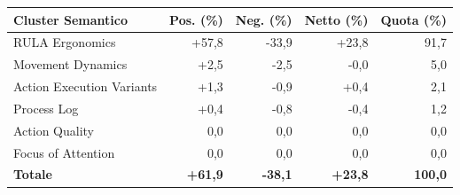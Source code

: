 \begin{tabular*}{\linewidth}{@{}l@{\extracolsep{\fill}}rrrr@{}}
\toprule
\textbf{Cluster Semantico} & \textbf{Pos. (\%)} & \textbf{Neg. (\%)} & \textbf{Netto (\%)} & \textbf{Quota (\%)} \\
\midrule
RULA Ergonomics & +57{,}8 & -33{,}9 & +23{,}8 & 91{,}7 \\
Movement Dynamics & +2{,}5 & -2{,}5 & -0{,}0 & 5{,}0 \\
Action Execution Variants & +1{,}3 & -0{,}9 & +0{,}4 & 2{,}1 \\
Process Log & +0{,}4 & -0{,}8 & -0{,}4 & 1{,}2 \\
Action Quality & 0{,}0 & 0{,}0 & 0{,}0 & 0{,}0 \\
Focus of Attention & 0{,}0 & 0{,}0 & 0{,}0 & 0{,}0 \\
\midrule
\textbf{Totale} & \textbf{+61{,}9} & \textbf{-38{,}1} & \textbf{+23{,}8} & \textbf{100{,}0} \\
\bottomrule
\end{tabular*}
